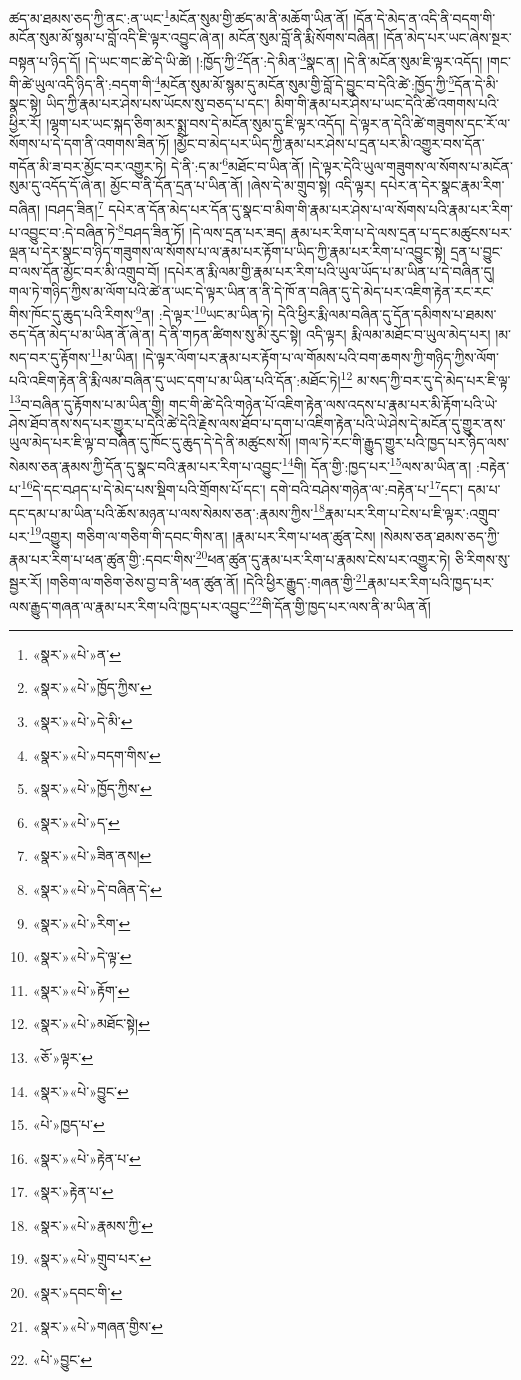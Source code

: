 ཚད་མ་ཐམས་ཅད་ཀྱི་ནང་:ན་ཡང་\footnote{«སྣར་»«པེ་»ན་}མངོན་སུམ་གྱི་ཚད་མ་ནི་མཆོག་ཡིན་ནོ། །དོན་དེ་མེད་ན་འདི་ནི་བདག་གི་མངོན་སུམ་མོ་སྙམ་པ་བློ་འདི་ཇི་ལྟར་འབྱུང་ཞེ་ན། མངོན་སུམ་བློ་ནི་རྨི་སོགས་བཞིན། །དོན་མེད་པར་ཡང་ཞེས་སྔར་བསྟན་པ་ཉིད་དོ། །དེ་ཡང་གང་ཚེ་དེ་ཡི་ཚེ། །:ཁྱོད་ཀྱི་\footnote{«སྣར་»«པེ་»ཁྱོད་ཀྱིས་}དོན་:དེ་མིན་\footnote{«སྣར་»«པེ་»དེ་མི་}སྣང་ན། །དེ་ནི་མངོན་སུམ་ཇི་ལྟར་འདོད། །གང་གི་ཚེ་ཡུལ་འདི་ཉིད་ནི་:བདག་གི་\footnote{«སྣར་»«པེ་»བདག་གིས་}མངོན་སུམ་མོ་སྙམ་དུ་མངོན་སུམ་གྱི་བློ་དེ་བྱུང་བ་དེའི་ཚེ་:ཁྱོད་ཀྱི་\footnote{«སྣར་»«པེ་»ཁྱོད་ཀྱིས་}དོན་དེ་མི་སྣང་སྟེ། ཡིད་ཀྱི་རྣམ་པར་ཤེས་པས་ཡོངས་སུ་བཅད་པ་དང་། མིག་གི་རྣམ་པར་ཤེས་པ་ཡང་དེའི་ཚེ་འགགས་པའི་ཕྱིར་རོ། །ལྷག་པར་ཡང་སྐད་ཅིག་མར་སྨྲ་བས་དེ་མངོན་སུམ་དུ་ཇི་ལྟར་འདོད། དེ་ལྟར་ན་དེའི་ཚེ་གཟུགས་དང་རོ་ལ་སོགས་པ་དེ་དག་ནི་འགགས་ཟིན་ཏོ། །མྱོང་བ་མེད་པར་ཡིད་ཀྱི་རྣམ་པར་ཤེས་པ་དྲན་པར་མི་འགྱུར་བས་དོན་གདོན་མི་ཟ་བར་མྱོང་བར་འགྱུར་ཏེ། དེ་ནི་:ད་མ་\footnote{«སྣར་»«པེ་»ད་}མཐོང་བ་ཡིན་ནོ། །དེ་ལྟར་དེའི་ཡུལ་གཟུགས་ལ་སོགས་པ་མངོན་སུམ་དུ་འདོད་དོ་ཞེ་ན། མྱོང་བ་ནི་དོན་དྲན་པ་ཡིན་ནོ། །ཞེས་དེ་མ་གྲུབ་སྟེ། འདི་ལྟར། དཔེར་ན་དེར་སྣང་རྣམ་རིག་བཞིན། །བཤད་ཟིན།\footnote{«སྣར་»«པེ་»ཟིན་ནས།} དཔེར་ན་དོན་མེད་པར་དོན་དུ་སྣང་བ་མིག་གི་རྣམ་པར་ཤེས་པ་ལ་སོགས་པའི་རྣམ་པར་རིག་པ་འབྱུང་བ་:དེ་བཞིན་ཏེ་\footnote{«སྣར་»«པེ་»དེ་བཞིན་དེ་}བཤད་ཟིན་ཏོ། །དེ་ལས་དྲན་པར་ཟད། རྣམ་པར་རིག་པ་དེ་ལས་དྲན་པ་དང་མཚུངས་པར་ལྡན་པ་དེར་སྣང་བ་ཉིད་གཟུགས་ལ་སོགས་པ་ལ་རྣམ་པར་རྟོག་པ་ཡིད་ཀྱི་རྣམ་པར་རིག་པ་འབྱུང་སྟེ། དྲན་པ་བྱུང་བ་ལས་དོན་མྱོང་བར་མི་འགྲུབ་བོ། །དཔེར་ན་རྨི་ལམ་གྱི་རྣམ་པར་རིག་པའི་ཡུལ་ཡོད་པ་མ་ཡིན་པ་དེ་བཞིན་དུ། གལ་ཏེ་གཉིད་ཀྱིས་མ་ལོག་པའི་ཚེ་ན་ཡང་དེ་ལྟར་ཡིན་ན་ནི་དེ་ཁོ་ན་བཞིན་དུ་དེ་མེད་པར་འཇིག་རྟེན་རང་རང་གིས་ཁོང་དུ་ཆུད་པའི་རིགས་\footnote{«སྣར་»«པེ་»རིག་}ན། :དེ་ལྟར་\footnote{«སྣར་»«པེ་»དེ་ལྟ་}ཡང་མ་ཡིན་ཏེ། དེའི་ཕྱིར་རྨི་ལམ་བཞིན་དུ་དོན་དམིགས་པ་ཐམས་ཅད་དོན་མེད་པ་མ་ཡིན་ནོ་ཞེ་ན། དེ་ནི་གཏན་ཚིགས་སུ་མི་རུང་སྟེ། འདི་ལྟར། རྨི་ལམ་མཐོང་བ་ཡུལ་མེད་པར། །མ་སད་བར་དུ་རྟོགས་\footnote{«སྣར་»«པེ་»རྟོག་}མ་ཡིན། །དེ་ལྟར་ལོག་པར་རྣམ་པར་རྟོག་པ་ལ་གོམས་པའི་བག་ཆགས་ཀྱི་གཉིད་ཀྱིས་ལོག་པའི་འཇིག་རྟེན་ནི་རྨི་ལམ་བཞིན་དུ་ཡང་དག་པ་མ་ཡིན་པའི་དོན་:མཐོང་ཏེ།\footnote{«སྣར་»«པེ་»མཐོང་སྟེ།} མ་སད་ཀྱི་བར་དུ་དེ་མེད་པར་ཇི་ལྟ་\footnote{«ཅོ་»ལྟར་}བ་བཞིན་དུ་རྟོགས་པ་མ་ཡིན་གྱི། གང་གི་ཚེ་དེའི་གཉེན་པོ་འཇིག་རྟེན་ལས་འདས་པ་རྣམ་པར་མི་རྟོག་པའི་ཡེ་ཤེས་ཐོབ་ནས་སད་པར་གྱུར་པ་དེའི་ཚེ་དེའི་རྗེས་ལས་ཐོབ་པ་དག་པ་འཇིག་རྟེན་པའི་ཡེ་ཤེས་དེ་མངོན་དུ་གྱུར་ནས་ཡུལ་མེད་པར་ཇི་ལྟ་བ་བཞིན་དུ་ཁོང་དུ་ཆུད་དེ་དེ་ནི་མཚུངས་སོ། །གལ་ཏེ་རང་གི་རྒྱུད་གྱུར་པའི་ཁྱད་པར་ཉིད་ལས་སེམས་ཅན་རྣམས་ཀྱི་དོན་དུ་སྣང་བའི་རྣམ་པར་རིག་པ་འབྱུང་\footnote{«སྣར་»«པེ་»བྱུང་}གི། དོན་གྱི་:ཁྱད་པར་\footnote{«པེ་»ཁྱད་པ་}ལས་མ་ཡིན་ན། :བརྟེན་པ་\footnote{«སྣར་»«པེ་»རྟེན་པ་}དེ་དང་བཤད་པ་དེ་མེད་པས་སྡིག་པའི་གྲོགས་པོ་དང་། དགེ་བའི་བཤེས་གཉེན་ལ་:བརྟེན་པ་\footnote{«སྣར་»རྟེན་པ་}དང་། དམ་པ་དང་དམ་པ་མ་ཡིན་པའི་ཆོས་མཉན་པ་ལས་སེམས་ཅན་:རྣམས་ཀྱིས་\footnote{«སྣར་»«པེ་»རྣམས་ཀྱི་}རྣམ་པར་རིག་པ་ངེས་པ་ཇི་ལྟར་:འགྲུབ་པར་\footnote{«སྣར་»«པེ་»གྲུབ་པར་}འགྱུར། གཅིག་ལ་གཅིག་གི་དབང་གིས་ན། །རྣམ་པར་རིག་པ་ཕན་ཚུན་ངེས། །སེམས་ཅན་ཐམས་ཅད་ཀྱི་རྣམ་པར་རིག་པ་ཕན་ཚུན་གྱི་:དབང་གིས་\footnote{«སྣར་»དབང་གི་}ཕན་ཚུན་དུ་རྣམ་པར་རིག་པ་རྣམས་ངེས་པར་འགྱུར་ཏེ། ཅི་རིགས་སུ་སྦྱར་རོ། །གཅིག་ལ་གཅིག་ཅེས་བྱ་བ་ནི་ཕན་ཚུན་ནོ། །དེའི་ཕྱིར་རྒྱུད་:གཞན་གྱི་\footnote{«སྣར་»«པེ་»གཞན་གྱིས་}རྣམ་པར་རིག་པའི་ཁྱད་པར་ལས་རྒྱུད་གཞན་ལ་རྣམ་པར་རིག་པའི་ཁྱད་པར་འབྱུང་\footnote{«པེ་»བྱུང་}གི་དོན་གྱི་ཁྱད་པར་ལས་ནི་མ་ཡིན་ནོ། 